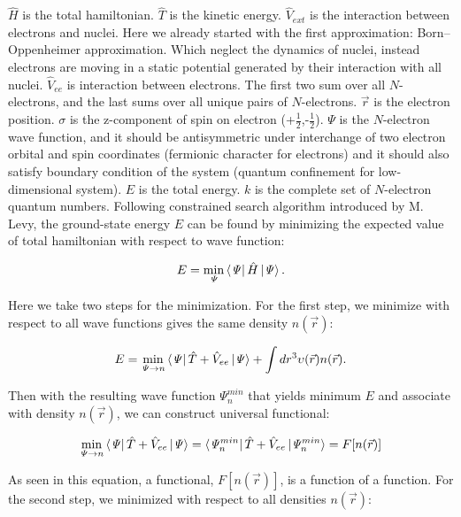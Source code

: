 $\hat{H}$ is the total hamiltonian. $\hat{T}$ is the kinetic energy. $\hat{V}_{ext}$ is the interaction between electrons and nuclei. Here we already started with the first approximation: Born–Oppenheimer approximation\cite{Born1927}. Which neglect the dynamics of nuclei, instead electrons are moving in a static potential generated by their interaction with all nuclei. $\hat{V}_{ee}$ is interaction between electrons. The first two sum over all $N$-electrons, and the last sums over all unique pairs of $N$-electrons. $\vec{r}$ is the electron position. $\sigma$ is the z-component of spin on electron (+$\frac{1}{2}$,-$\frac{1}{2}$). $\mathit{\Psi}$ is the $N$-electron wave function, and it should be antisymmetric under interchange of two electron orbital and spin coordinates (fermionic character for electrons) and it should also satisfy boundary condition of the system (quantum confinement for low-dimensional system). $E$ is the total energy. $k$ is the complete set of $N$-electron quantum numbers. Following constrained search algorithm introduced by M. Levy\cite{Levy1979}, the ground-state energy $E$ can be found by minimizing the expected value of total hamiltonian with respect to wave function:

\begin{equation}
E=\min_\mathit{\Psi}\bra{\mathit{\Psi}}\hat{H}\ket{\mathit{\Psi}}.
\end{equation}

Here we take two steps for the minimization. For the first step, we minimize with respect to all wave functions gives the same density $n(\vec{r})$:

\begin{equation}
E=\min_{\mathit{\Psi}\rightarrow n}\bra{\mathit{\Psi}}\hat{T}+\hat{V}_{ee}\ket{\mathit{\Psi}}+\int dr^3\upsilon(\vec{r})n(\vec{r}).
\end{equation}

Then with the resulting wave function $\mathit{\Psi}^{min}_n$ that yields minimum $E$ and associate with density $n(\vec{r})$, we can construct universal functional:

\begin{equation}
\min_{\mathit{\Psi}\rightarrow n}\bra{\mathit{\Psi}}\hat{T}+\hat{V}_{ee}\ket{\mathit{\Psi}}=\bra{\mathit{\Psi}^{min}_n}\hat{T}+\hat{V}_{ee}\ket{\mathit{\Psi}^{min}_n}=F[n(\vec{r})]
\end{equation}

As seen in this equation, a functional, $F[n(\vec{r})]$, is a function of a function. For the second step, we minimized with respect to all densities $n(\vec{r})$:

